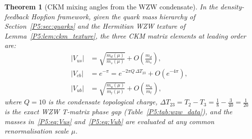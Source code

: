\documentclass[11pt,a4paper]{article}
\newtheorem{theorem}{Theorem}[section]
\theoremstyle{definition}
\theoremstyle{remark}
\begin{document}
\begin{theorem}[CKM mixing angles from the WZW condensate]
\label{P5:thm:ckm_full}
In the density-feedback Hopfion framework, given the quark mass hierarchy
of Section~\ref{P5:sec:quarks} and the Hermitian WZW texture of
Lemma~\ref{P5:lem:ckm_texture}, the three CKM matrix elements at leading order are:
\begin{align}
  |V_{us}| &= \sqrt{\frac{m_d(\mu)}{m_s(\mu)}} + O\!\left(\frac{m_d}{m_s}\right),
  \label{P5:eq:Vus} \\[4pt]
  |V_{cb}| &= e^{-\pi} = e^{-2\pi Q\,\Delta T_{23}} + O\!\left(e^{-4\pi}\right),
  \label{P5:eq:Vcb} \\[4pt]
  |V_{ub}| &= \sqrt{\frac{m_u(\mu)}{m_t(\mu)}} + O\!\left(\frac{m_u}{m_t}\right),
  \label{P5:eq:Vub}
\end{align}
where $Q=10$ is the condensate topological charge,
$\Delta T_{23} = T_2 - T_3 = \tfrac{1}{8} - \tfrac{3}{40} = \tfrac{1}{20}$
is the exact WZW T-matrix phase gap (Table~\ref{P5:tab:wzw_data}),
and the masses in~\eqref{P5:eq:Vus} and~\eqref{P5:eq:Vub} are evaluated at any
common renormalisation scale $\mu$.
\end{theorem}
\end{document}
